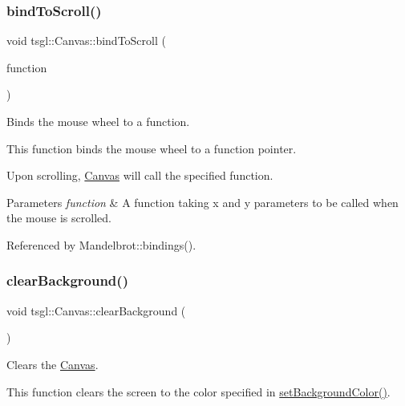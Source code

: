 \subsubsection{\texorpdfstring{bind\+To\+Scroll()}{bindToScroll()}}
{\footnotesize\ttfamily void tsgl\+::\+Canvas\+::bind\+To\+Scroll (\begin{DoxyParamCaption}\item[{std\+::function$<$ void(double, double)$>$}]{function }\end{DoxyParamCaption})}



Binds the mouse wheel to a function. 

This function binds the mouse wheel to a function pointer.

Upon scrolling, \hyperlink{classtsgl_1_1_canvas}{Canvas} will call the specified function. 
\begin{DoxyParams}{Parameters}
{\em function} & A function taking x and y parameters to be called when the mouse is scrolled. \\
\hline
\end{DoxyParams}


Referenced by Mandelbrot\+::bindings().

\mbox{\label{classtsgl_1_1_canvas_af1f7728d3f65494fe463bf6e8fcb28cc}} 
\subsubsection{\texorpdfstring{clear\+Background()}{clearBackground()}}
{\footnotesize\ttfamily void tsgl\+::\+Canvas\+::clear\+Background (\begin{DoxyParamCaption}{ }\end{DoxyParamCaption})}



Clears the \hyperlink{classtsgl_1_1_canvas}{Canvas}. 

This function clears the screen to the color specified in \hyperlink{classtsgl_1_1_canvas_abb668fe42e2fe7f269b255152df959d8}{set\+Background\+Color()}. \mbox{\label{classtsgl_1_1_canvas_aae3223aa585a9992924e7aba16eb1fd8}} 
